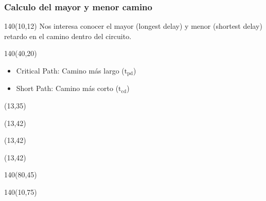 \documentclass[aspectratio=169]{beamer}
\begin{document}
\begin{frame}[fragile,t]
    \frametitle{Calculo del mayor y menor camino}
    \begin{textblock}{140}(10,12)
    Nos interesa conocer el mayor (\textcolor{naranjauca}{longest delay}) y menor (\textcolor{naranjauca}{shortest delay}) retardo en el camino dentro del circuito.
    \end{textblock}
    \begin{textblock}{140}(40,20)
    \begin{itemize}
    \item \textcolor{naranjauca}{Critical Path}: Camino más largo ($\text{t}_{\text{pd}}$)
    \item \textcolor{naranjauca}{Short Path}: Camino más corto ($\text{t}_{\text{cd}}$)
    \end{itemize}
    \end{textblock}
    \begin{textblock}{50}(13,35)  \end{textblock}
    \begin{textblock}{50}(13,42)  \end{textblock}
    \begin{textblock}{50}(13,42)  \end{textblock}
    \begin{textblock}{50}(13,42)  \end{textblock}
    \begin{textblock}{140}(80,45)
    \end{textblock}
    \begin{textblock}{140}(10,75)
    \begin{center}
    \end{center}
    \end{textblock}
\end{frame}
\end{document}
